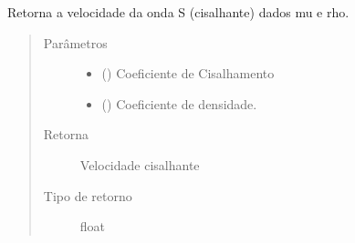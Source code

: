 \documentclass[letterpaper,10pt,brazil]{sphinxmanual}
\begin{document}

\begin{fulllineitems}
\label{\detokenize{source/base:base.velocity_s_by_shear}}
Retorna a velocidade da onda S (cisalhante) dados mu e rho.
\begin{quote}\begin{description}
\item[{Parâmetros}] \leavevmode\begin{itemize}
\item {} 
 () \textendash{} Coeficiente de Cisalhamento

\item {} 
 () \textendash{} Coeficiente de densidade.

\end{itemize}

\item[{Retorna}] \leavevmode
Velocidade cisalhante

\item[{Tipo de retorno}] \leavevmode
float

\end{description}\end{quote}

\end{fulllineitems}

\end{document}
